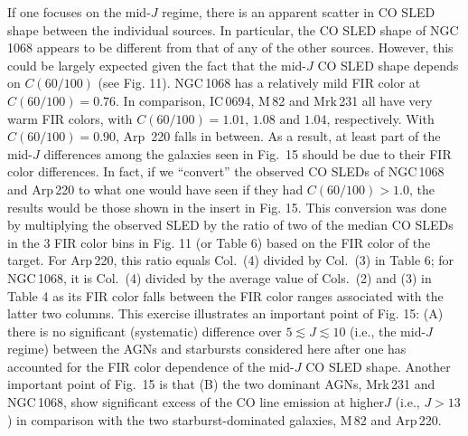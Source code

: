 \documentclass[preprint]{aastex}
\begin{document}
If one focuses on the mid-$J$
regime, there is an apparent scatter in CO SLED shape between
the individual sources. In particular, the CO SLED shape of NGC\,1068 appears
to be different from that of any of the other sources. 
However, this could be largely expected given the fact that the mid-$J$ CO SLED
shape depends on $C(60/100)$ (see Fig. 11).  NGC\,1068 has a relatively
mild FIR color at $C(60/100) = 0.76$.  In comparison, IC\,0694, M\,82
and Mrk\,231 all have very warm FIR colors, with $C(60/100) = 1.01$,
$1.08$ and $1.04$, respectively.   With $C(60/100) = 0.90$, 
Arp \,220 falls in between.  As a result,  at least part of the mid-$J$ 
differences among the galaxies seen in Fig.~15 should be due to their FIR 
color differences.  
In fact, if we ``convert'' the observed CO SLEDs of NGC\,1068 and Arp\,220 
to what one would have seen if they had $C(60/100) > 1.0$, the results 
would be those shown in the insert in Fig. 15. This conversion was done by 
multiplying the observed SLED by the ratio of two of the median CO SLEDs
in the 3 FIR color bins in Fig. 11 (or Table 6) based on the FIR color 
of the target. For Arp\,220, this ratio equals Col.~(4) divided by Col.~(3)
in Table 6; for NGC\,1068, it is Col.~(4) divided by the average value of 
Cols.~(2) and (3) in Table 4 as its FIR color falls between the FIR color 
ranges associated with the latter two columns.  This exercise illustrates 
an important point of Fig. 15: (A) there is no significant (systematic) 
difference over $5 \lesssim J \lesssim 10$ (i.e., the mid-$J$ regime) 
between the AGNs and starbursts considered here after one has accounted 
for the FIR color dependence of the mid-$J$ CO SLED shape.     
Another important point of Fig.~15 is that (B) the two dominant AGNs, 
Mrk\,231 and NGC\,1068, show significant excess of the CO line emission
at higher$J$ (i.e., $J > 13$) in comparison with 
the two starburst-dominated galaxies, M\,82 and Arp\,220. 
\end{document}
